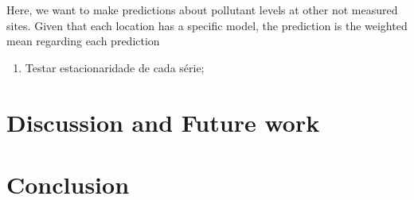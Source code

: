 Here, we want to make predictions about pollutant levels at other not measured
sites. Given that each location has a specific model, the prediction
is the weighted mean regarding each prediction 

\begin{enumerate}
    \item Testar estacionaridade de cada série;
\end{enumerate}



\section{Discussion and Future work}
\label{sec:discussion}


\section{Conclusion}
\label{sec:conclusion}
